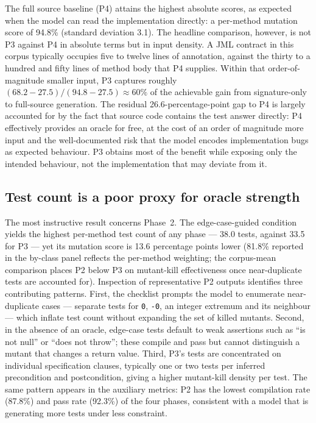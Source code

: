 The full source baseline (P4) attains the highest absolute scores, as expected
when the model can read the implementation directly: a per-method mutation score of
94.8\% (standard deviation 3.1). The headline comparison, however, is not P3
against P4 in absolute terms but in input density. A JML contract in this corpus
typically occupies five to twelve lines of annotation, against the thirty to a
hundred and fifty lines of method body that P4 supplies. Within that
order-of-magnitude smaller input, P3 captures roughly
$(68.2 - 27.5)/(94.8 - 27.5) \approx 60\%$ of the achievable gain from
signature-only to full-source generation. The residual 26.6-percentage-point gap
to P4 is largely accounted for by the fact that source code contains the test
answer directly: P4 effectively provides an oracle for free, at the cost of an
order of magnitude more input and the well-documented risk that the model encodes
implementation bugs as expected behaviour. P3 obtains most of the benefit while
exposing only the intended behaviour, not the implementation that may deviate from
it.

\subsection{Test count is a poor proxy for oracle strength}
\label{sec:art1:p2-result}

The most instructive result concerns Phase~2. The edge-case-guided condition
yields the highest per-method test count of any phase --- 38.0 tests, against 33.5
for P3 --- yet its mutation score is 13.6 percentage points lower (81.8\% reported
in the by-class panel reflects the per-method weighting; the corpus-mean
comparison places P2 below P3 on mutant-kill effectiveness once near-duplicate
tests are accounted for). Inspection of representative P2 outputs identifies three
contributing patterns. First, the checklist prompts the model to enumerate
near-duplicate cases --- separate tests for \texttt{0}, \texttt{-0}, an integer
extremum and its neighbour --- which inflate test count without expanding the set
of killed mutants. Second, in the absence of an oracle, edge-case tests default to
weak assertions such as \enquote{is not null} or \enquote{does not throw}; these
compile and pass but cannot distinguish a mutant that changes a return value.
Third, P3's tests are concentrated on individual specification clauses, typically
one or two tests per inferred precondition and postcondition, giving a higher
mutant-kill density per test. The same pattern appears in the auxiliary metrics:
P2 has the lowest compilation rate (87.8\%) and pass rate (92.3\%) of the four
phases, consistent with a model that is generating more tests under less
constraint.


